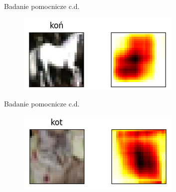 \documentclass[xcolor=dvipsnames]{beamer}
\begin{document}
\begin{frame}{Badanie pomocnicze c.d.}
  \begin{figure}
    \includegraphics[width=\textwidth]{img/heatmap_3.png}
  \end{figure}
\end{frame}
\begin{frame}{Badanie pomocnicze c.d.}
  \begin{figure}
    \includegraphics[width=\textwidth]{img/heatmap_4.png}
  \end{figure}
\end{frame}
\end{document}
